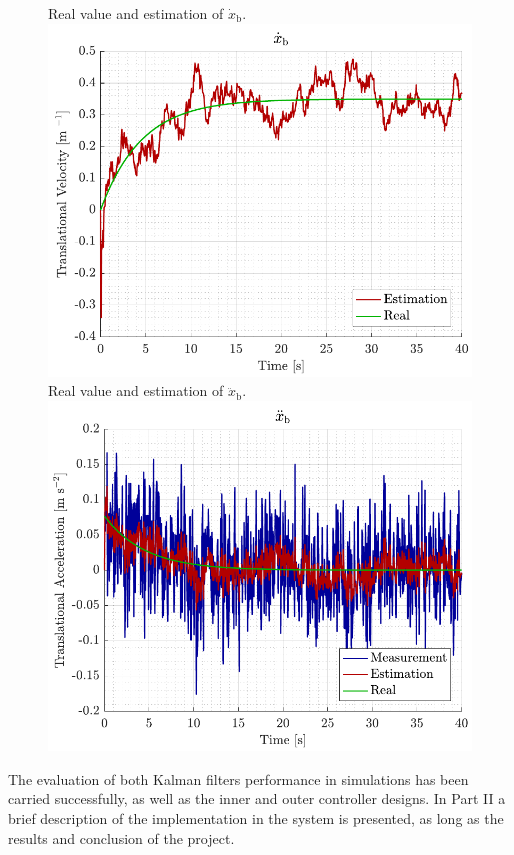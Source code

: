 \begin{figure}[H]
    \captionbox 
    {   
        Real value and estimation of $\dot{x}_\mathrm{b}$.
        \label{fig:sim_xbdot}
    }                                                                 
    {                                                                  
        \includegraphics[width=.45\textwidth]{figures/sim_xbdot}         
    }                                                                    
    \hspace{5pt}                                                          
    \captionbox  
    {      
        Real value and estimation of $\ddot{x}_\mathrm{b}$.
        \label{fig:sim_xbddot}
    }                                                                          
    {
        \includegraphics[width=.45\textwidth]{figures/sim_xbddot}
    }
\end{figure}

The evaluation of both Kalman filters performance in simulations has been carried successfully, as well as the inner and outer controller designs. In Part II a brief description of the implementation in the system is presented, as long as the results and conclusion of the project.